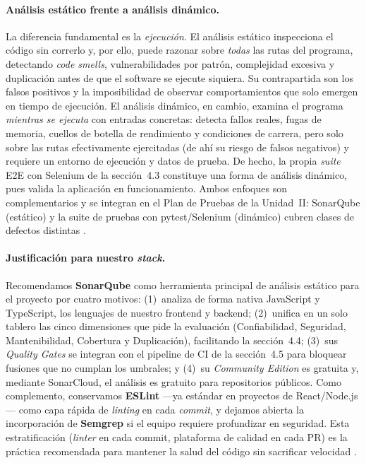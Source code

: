 \documentclass[12pt]{article}
\begin{document}
\paragraph{Análisis estático frente a análisis dinámico.}
La diferencia fundamental es la \emph{ejecución}. El análisis estático inspecciona el
código sin correrlo y, por ello, puede razonar sobre \emph{todas} las rutas del programa,
detectando \textit{code smells}, vulnerabilidades por patrón, complejidad excesiva y
duplicación antes de que el software se ejecute siquiera. Su contrapartida son los falsos
positivos y la imposibilidad de observar comportamientos que solo emergen en tiempo de
ejecución. El análisis dinámico, en cambio, examina el programa \emph{mientras se ejecuta}
con entradas concretas: detecta fallos reales, fugas de memoria, cuellos de botella de
rendimiento y condiciones de carrera, pero solo sobre las rutas efectivamente ejercitadas
(de ahí su riesgo de falsos negativos) y requiere un entorno de ejecución y datos de
prueba. De hecho, la propia \textit{suite} E2E con Selenium de la sección~4.3 constituye
una forma de análisis dinámico, pues valida la aplicación en funcionamiento. Ambos enfoques
son complementarios y se integran en el Plan de Pruebas de la Unidad~II: SonarQube (estático)
y la suite de pruebas con pytest/Selenium (dinámico) cubren clases de defectos distintas
\citep{aniche2022, khorikov2020}.

\paragraph{Justificación para nuestro \textit{stack}.}
Recomendamos \textbf{SonarQube} como herramienta principal de análisis estático para el
proyecto por cuatro motivos: (1)~analiza de forma nativa JavaScript y TypeScript, los
lenguajes de nuestro frontend y backend; (2)~unifica en un solo tablero las cinco
dimensiones que pide la evaluación (Confiabilidad, Seguridad, Mantenibilidad, Cobertura y
Duplicación), facilitando la sección~4.4; (3)~sus \textit{Quality Gates} se integran con el
pipeline de CI de la sección~4.5 para bloquear fusiones que no cumplan los umbrales; y
(4)~su \textit{Community Edition} es gratuita y, mediante SonarCloud, el análisis es
gratuito para repositorios públicos. Como complemento, conservamos \textbf{ESLint} ---ya
estándar en proyectos de React/Node.js--- como capa rápida de \textit{linting} en cada
\textit{commit}, y dejamos abierta la incorporación de \textbf{Semgrep} si el equipo
requiere profundizar en seguridad. Esta estratificación (\textit{linter} en cada commit,
plataforma de calidad en cada PR) es la práctica recomendada para mantener la salud del
código sin sacrificar velocidad \citep{aniche2022}.
\end{document}
